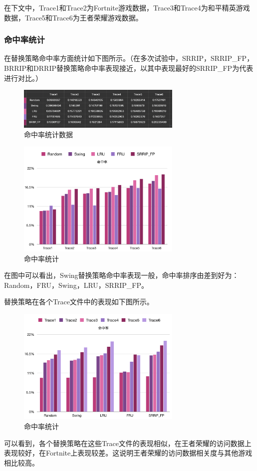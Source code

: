 \documentclass{article}
\begin{document}
在下文中，Trace1和Trace2为Fortnite游戏数据，Trace3和Trace4为和平精英游戏数据，Trace5和Trace6为王者荣耀游戏数据。

\subsubsection{命中率统计}
在替换策略命中率方面统计如下图所示。（在多次试验中，SRRIP，SRRIP\_FP，BRRIP和DRRIP替换策略命中率表现接近，以其中表现最好的SRRIP\_FP为代表进行对比。）

\begin{figure}[H]
    \centering
    \includegraphics[width=0.7\textwidth]{pic11.png}
    \caption{命中率统计数据}
\end{figure}

\begin{figure}[H]
    \centering
    \includegraphics[width=0.7\textwidth]{pic6.png}
    \caption{命中率统计}
\end{figure}
在图中可以看出，Swing替换策略命中率表现一般，命中率排序由差到好为：Random，FRU，Swing，LRU，SRRIP\_FP。

替换策略在各个Trace文件中的表现如下图所示。
\begin{figure}[H]
    \centering
    \includegraphics[width=0.7\textwidth]{pic7.png}
    \caption{命中率统计}
\end{figure}
可以看到，各个替换策略在这些Trace文件的表现相似，在王者荣耀的访问数据上表现较好，在Fortnite上表现较差。这说明王者荣耀的访问数据相关度与其他游戏相比较高。
\end{document}
